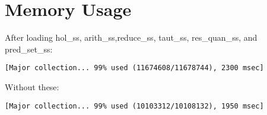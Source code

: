 \section{Memory Usage}

After loading hol\_ss, arith\_ss,reduce\_ss, taut\_ss,
res\_quan\_ss, and pred\_set\_ss:
\begin{verbatim}
[Major collection... 99% used (11674608/11678744), 2300 msec]
\end{verbatim}
Without these:
\begin{verbatim}
[Major collection... 99% used (10103312/10108132), 1950 msec]
\end{verbatim}
